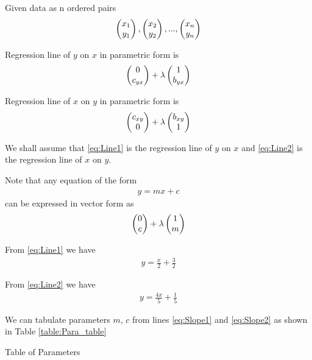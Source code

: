 \documentclass[journal,12pt,twocolumn]{IEEEtran}
\begin{document}
\solution

Given data as n ordered pairs
\begin{align}
  \begin{pmatrix}x_1\\y_1\end{pmatrix}, \begin{pmatrix}x_2\\y_2\end{pmatrix}, ..., \begin{pmatrix}x_n\\y_n\end{pmatrix}
\end{align}

Regression line of $y$ on $x$ in parametric form is
\begin{align}
  \begin{pmatrix}0\\c_{yx}\end{pmatrix} + \lambda\begin{pmatrix}1\\b_{yx}\end{pmatrix}
  \label{eq:Main_yx}
\end{align}

Regression line of $x$ on $y$ in parametric form is
\begin{align}
  \begin{pmatrix}c_{xy}\\0\end{pmatrix} + \lambda\begin{pmatrix}b_{xy}\\1\end{pmatrix}
  \label{eq:Main_xy}
\end{align}


We shall assume that
\eqref{eq:Line1}
is the regression line of $y$ on $x$ and
\eqref{eq:Line2}
is the regression line of $x$ on $y$.

Note that any equation of the form
\begin{align}
  y = mx + c
  \label{eq:Slope}
\end{align}
can be expressed in vector form as
\begin{align}
  \begin{pmatrix}0\\c\end{pmatrix} + \lambda\begin{pmatrix}1\\m\end{pmatrix}
  \label{eq:Vec}
\end{align}

From
\eqref{eq:Line1}
we have
\begin{align}
  y = \frac{x}{2} + \frac{3}{2}
  \label{eq:Slope1}
\end{align}

From
\eqref{eq:Line2}
we have
\begin{align}
  y = \frac{4x}{5} + \frac{1}{5}
  \label{eq:Slope2}
\end{align}

We can tabulate parameters $m$, $c$ from lines
\eqref{eq:Slope1}
and
\eqref{eq:Slope2}
as shown in Table
\eqref{table:Para_table}

\begin{table}[!ht]
  \centering
  
  \caption{Table of Parameters}
  \label{table:Para_table}	
\end{table}
\end{document}
